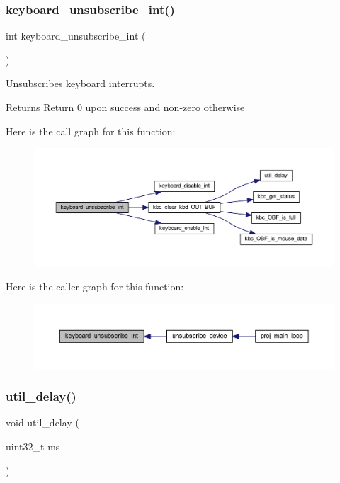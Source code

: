 \subsubsection{\texorpdfstring{keyboard\+\_\+unsubscribe\+\_\+int()}{keyboard\_unsubscribe\_int()}}
{\footnotesize\ttfamily int keyboard\+\_\+unsubscribe\+\_\+int (\begin{DoxyParamCaption}{ }\end{DoxyParamCaption})}



Unsubscribes keyboard interrupts. 

\begin{DoxyReturn}{Returns}
Return 0 upon success and non-\/zero otherwise 
\end{DoxyReturn}
Here is the call graph for this function\+:\nopagebreak
\begin{figure}[H]
\begin{center}
\leavevmode
\includegraphics[width=350pt]{group__keyboard_gac95aea27a5e91b363b876fed881f368f_cgraph}
\end{center}
\end{figure}
Here is the caller graph for this function\+:\nopagebreak
\begin{figure}[H]
\begin{center}
\leavevmode
\includegraphics[width=350pt]{group__keyboard_gac95aea27a5e91b363b876fed881f368f_icgraph}
\end{center}
\end{figure}
\mbox{\label{group__keyboard_ga686f8d95e71a43edaddda1db8b78caa4}} 
\subsubsection{\texorpdfstring{util\+\_\+delay()}{util\_delay()}}
{\footnotesize\ttfamily void util\+\_\+delay (\begin{DoxyParamCaption}\item[{uint32\+\_\+t}]{ms }\end{DoxyParamCaption})}



